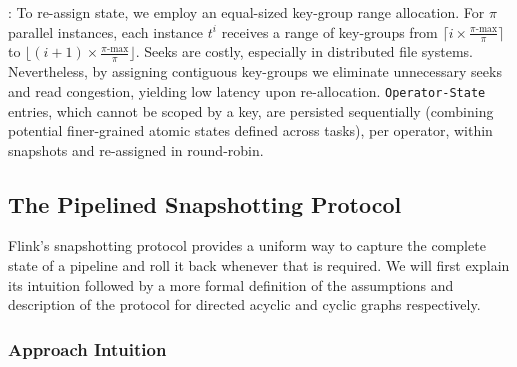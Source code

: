 : To re-assign state, we employ an equal-sized  key-group range allocation. For $\pi$ parallel instances, each instance $t^i$ receives a range of key-groups from $\lceil i \times \frac{\pi\text{-max}}{\pi} \rceil$ to $\lfloor (i+1) \times \frac{\pi\text{-max}}{\pi} \rfloor$. Seeks are costly, especially in distributed file systems. Nevertheless, by assigning contiguous key-groups we eliminate unnecessary seeks and read congestion, yielding low latency upon re-allocation. 
\texttt{Operator-State} entries, which cannot be scoped by a key, are persisted sequentially (combining potential finer-grained atomic states defined across tasks), per operator, within snapshots and re-assigned in round-robin.



\subsection{The Pipelined Snapshotting Protocol}
\label{sec:snapshots}

Flink's snapshotting protocol provides a uniform way to capture the complete state of a pipeline and roll it back whenever that is required. We will first explain its intuition followed by a more formal definition of the assumptions and description of the protocol for directed acyclic and cyclic graphs respectively.


\subsubsection{Approach Intuition}


